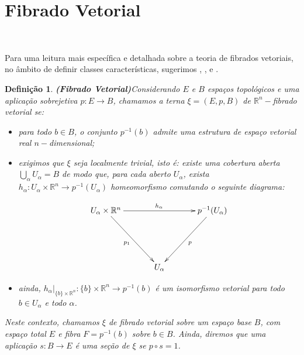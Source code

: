 \documentclass[12pt,oneside]{book} %
\newtheorem{defi}   {\hspace{0.5cm}Defini\c c\~ao}[chapter]
\newcommand{\ds}{\displaystyle}
\newcommand{\R}{\mathbb{R}}
\begin{document}



\section{Fibrado Vetorial}\label{secao_fib_vet}

\

\par Para uma leitura mais específica e detalhada sobre a teoria de fibrados vetoriais, no âmbito de definir classes características, sugerimos \cite{alex}, \cite{hatcher_2}, \cite{husemoller} e \cite{milnor_1}.

\begin{defi}{\bf (Fibrado Vetorial)}\label{fv_defi}
	Considerando $E$ e $B$ espaços topológicos e uma aplicação sobrejetiva $p:E\to B$, chamamos a terna $\xi=(E,p,B)$ de $\R^{n}-$fibrado vetorial se:
	
	\begin{itemize}
		\item para todo $b\in B$, o conjunto $p^{-1}(b)$ admite uma estrutura de espaço vetorial real $n-$dimensional; 
		\item exigimos que $\xi$ seja localmente trivial, isto é: existe uma cobertura aberta $\ds\bigcup_{\alpha}U_{\alpha}=B$ de modo que, para cada aberto $U_{\alpha}$, exista $h_{\alpha}:U_{\alpha}\times\R^{n}\to p^{-1}(U_{\alpha})$ homeomorfismo comutando o seguinte diagrama:
		
		$$\xymatrix @C=0.5cm {
			U_{\alpha}\times\R^{n} \ar[rrrr]^{h_{\alpha}} \ar[ddrr]_{p_{1}} && && p^{-1}(U_{\alpha}) \ar[ddll]^{p} \\
			&& && \\
			&& U_{\alpha} && 
		}$$
		
		\item ainda, $h_{\alpha}|_{\{b\}\times\R^{n}}:\{b\}\times\R^{n}\to p^{-1}(b)$ é um isomorfismo vetorial para todo $b\in U_{\alpha}$ e todo $\alpha$.
	\end{itemize}
	
	Neste contexto, chamamos $\xi$ de fibrado vetorial sobre um espaço base $B$, com espaço total $E$ e fibra $F=p^{-1}(b)$ sobre $b\in B$. Ainda, diremos que uma aplicação $s:B\to E$ é uma seção de $\xi$ se $p\circ s=1$.
\end{defi}
\end{document}
